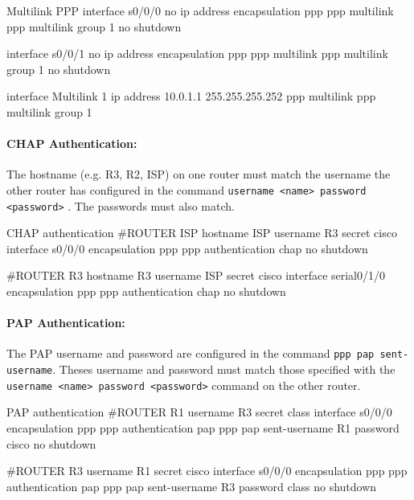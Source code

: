 \begin{sexylisting}{Multilink PPP}
interface s0/0/0
  no ip address
  encapsulation ppp
  ppp multilink	
  ppp multilink group 1
  no shutdown
	
interface s0/0/1
  no ip address
  encapsulation ppp
  ppp multilink	
  ppp multilink group 1
  no shutdown
	
interface Multilink 1
  ip address 10.0.1.1 255.255.255.252
  ppp multilink	
  ppp multilink group 1
\end{sexylisting}
	
\paragraph{CHAP Authentication:} The hostname (e.g. R3, R2, ISP) on one router must match the username the other router has configured in the command \verb|username <name> password <password>| . The passwords must also match.

\begin{sexylisting}{CHAP authentication}
#ROUTER ISP
hostname ISP
username R3 secret cisco
interface s0/0/0
  encapsulation ppp
  ppp authentication chap
  no shutdown  

#ROUTER R3
hostname R3
username ISP secret cisco
interface serial0/1/0
  encapsulation ppp
  ppp authentication chap	
  no shutdown
\end{sexylisting}

\paragraph{PAP Authentication:} The PAP username and password are configured in the command \verb|ppp pap sent-username|. Theses username and password must match those specified with the \verb|username <name> password <password>| command on the other router.

\begin{sexylisting}{PAP authentication}
#ROUTER R1
username R3 secret class
interface s0/0/0
  encapsulation ppp
  ppp authentication pap
  ppp pap sent-username R1 password cisco
  no shutdown
	
#ROUTER R3	
username R1 secret cisco
interface s0/0/0
  encapsulation ppp
  ppp authentication pap
  ppp pap sent-username R3 password class	
  no shutdown
\end{sexylisting}
